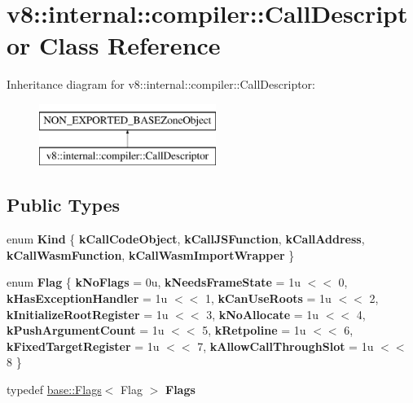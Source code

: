 \hypertarget{classv8_1_1internal_1_1compiler_1_1CallDescriptor}{}\section{v8\+:\+:internal\+:\+:compiler\+:\+:Call\+Descriptor Class Reference}
\label{classv8_1_1internal_1_1compiler_1_1CallDescriptor}
Inheritance diagram for v8\+:\+:internal\+:\+:compiler\+:\+:Call\+Descriptor\+:\begin{figure}[H]
\begin{center}
\leavevmode
\includegraphics[height=2.000000cm]{classv8_1_1internal_1_1compiler_1_1CallDescriptor}
\end{center}
\end{figure}
\subsection*{Public Types}
\begin{DoxyCompactItemize}
\item 
\mbox{\label{classv8_1_1internal_1_1compiler_1_1CallDescriptor_afedde2451ce98788cc0210f0f161ef3b}} 
enum {\bfseries Kind} \{ \newline
{\bfseries k\+Call\+Code\+Object}, 
{\bfseries k\+Call\+J\+S\+Function}, 
{\bfseries k\+Call\+Address}, 
{\bfseries k\+Call\+Wasm\+Function}, 
\newline
{\bfseries k\+Call\+Wasm\+Import\+Wrapper}
 \}
\item 
\mbox{\label{classv8_1_1internal_1_1compiler_1_1CallDescriptor_aee4b455cd452621a57aaf6cd61368c4c}} 
enum {\bfseries Flag} \{ \newline
{\bfseries k\+No\+Flags} = 0u, 
{\bfseries k\+Needs\+Frame\+State} = 1u $<$$<$ 0, 
{\bfseries k\+Has\+Exception\+Handler} = 1u $<$$<$ 1, 
{\bfseries k\+Can\+Use\+Roots} = 1u $<$$<$ 2, 
\newline
{\bfseries k\+Initialize\+Root\+Register} = 1u $<$$<$ 3, 
{\bfseries k\+No\+Allocate} = 1u $<$$<$ 4, 
{\bfseries k\+Push\+Argument\+Count} = 1u $<$$<$ 5, 
{\bfseries k\+Retpoline} = 1u $<$$<$ 6, 
\newline
{\bfseries k\+Fixed\+Target\+Register} = 1u $<$$<$ 7, 
{\bfseries k\+Allow\+Call\+Through\+Slot} = 1u $<$$<$ 8
 \}
\item 
\mbox{\label{classv8_1_1internal_1_1compiler_1_1CallDescriptor_aeac972da3bec5cdaf4ead4bb25ddb486}} 
typedef \mbox{\hyperlink{classv8_1_1base_1_1Flags}{base\+::\+Flags}}$<$ Flag $>$ {\bfseries Flags}
\end{DoxyCompactItemize}
